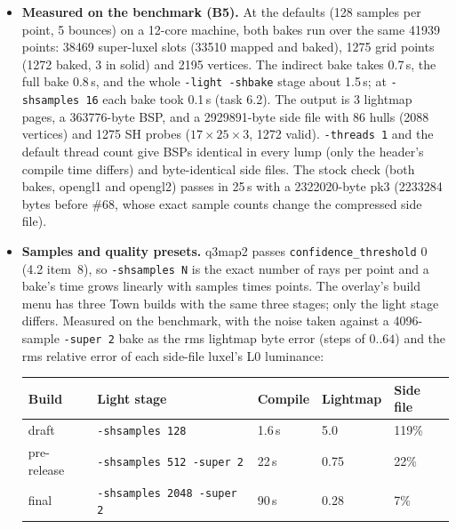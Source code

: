 \documentclass[11pt,a4paper]{article}
\begin{document}
\begin{itemize}
  final byte. The neutral bytes under \texttt{-shnofull} are 64 (lightmap and vertex) and ambient 63
  with directed 0 (grid). The constants live in \texttt{light\_sh\_model.h}; the gamepack README
  has the opengl2 differences (shift 1, $\times 2$ except \texttt{rgbGen vertex}, auto-exposure).
\item \textbf{Measured on the benchmark (B5).} At the defaults (128 samples per point, 5 bounces)
  on a 12-core machine, both bakes run over the same 41939 points: 38469 super-luxel slots (33510 mapped and baked),
  1275 grid points (1272 baked, 3 in solid) and 2195 vertices. The indirect bake takes 0.7\,s, the
  full bake 0.8\,s, and the whole \texttt{-light -shbake} stage about 1.5\,s; at
  \texttt{-shsamples 16} each bake took 0.1\,s (task 6.2). The output is 3 lightmap pages, a 363776-byte BSP, and a 2929891-byte side file with 86
  hulls (2088 vertices) and 1275 SH probes ($17\times25\times3$, 1272 valid). \texttt{-threads 1}
  and the default thread count give BSPs identical in every lump (only the header's compile
  time differs) and byte-identical side files. The stock check (both bakes,
  opengl1 and opengl2) passes in 25\,s with a 2322020-byte pk3 (2233284 bytes before \#68, whose exact sample
  counts change the compressed side file).
\item \textbf{Samples and quality presets.} q3map2 passes \texttt{confidence\_threshold} 0
  (4.2 item~8), so \texttt{-shsamples N} is the exact number of rays per point and a bake's time
  grows linearly with samples times points. The overlay's build menu has three Town builds with the
  same three stages; only the light stage differs. Measured on the benchmark, with the noise taken
  against a 4096-sample \texttt{-super 2} bake as the rms lightmap byte error (steps of $0..64$)
  and the rms relative error of each side-file luxel's L0 luminance:

  \smallskip
  \begin{tabular}{@{}lllll@{}}
  \toprule
  Build & Light stage & Compile & Lightmap & Side file \\
  \midrule
  draft & \texttt{-shsamples 128} & 1.6\,s & 5.0 & 119\% \\
  pre-release & \texttt{-shsamples 512 -super 2} & 22\,s & 0.75 & 22\% \\
  final & \texttt{-shsamples 2048 -super 2} & 90\,s & 0.28 & 7\% \\
  \bottomrule
  \end{tabular}
  \smallskip


\end{itemize}
\end{document}
